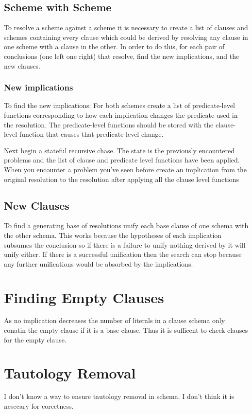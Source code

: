 \documentclass{article}
\begin{document}
\subsection{Scheme with Scheme}


    To resolve a scheme against a scheme it is necessary to create a list of clauses and schemes containing every clause which could be derived by resolving any clause in one scheme with a clause in the other.
    In order to do this, for each pair of conclusions (one left one right) that resolve, find the new implications, and the new clauses.

\subsubsection{New implications}
  
  To find the new implications: For both schemes create a list of predicate-level functions corresponding to how each implication changes the predicate
  used in the resolution.
  The predicate-level functions should be stored with the clause-level function that causes that predicate-level change.

  Next begin a stateful recursive chase.
    The state is the previously encountered problems and the list of clause and predicate level functions have been applied.
    When you encounter a problem you've seen before create an implication
    from the original resolution to the resolution after applying all the clause level functions

\subsection{New Clauses}

          To find a generating base of resolutions unify each base clause of one schema with the other schema.
             This works because the hypotheses of each implication subsumes the conclusion so if there is a failure to unify nothing derived by it will unify either.
             If there is a successful unification then the search can stop because any further unifications would be absorbed by the implications.

\section{Finding Empty Clauses}
  As no implication decreases the number of literals in a clause schema only conatin the empty clause if it is a base clause.
  Thus it is sufficent to check clauses for the empty clause.

\section{Tautology Removal}
  I don't know a way to ensure tautology removal in schema.
  I don't think it is nesecary for corectness.
  
\end{document}
